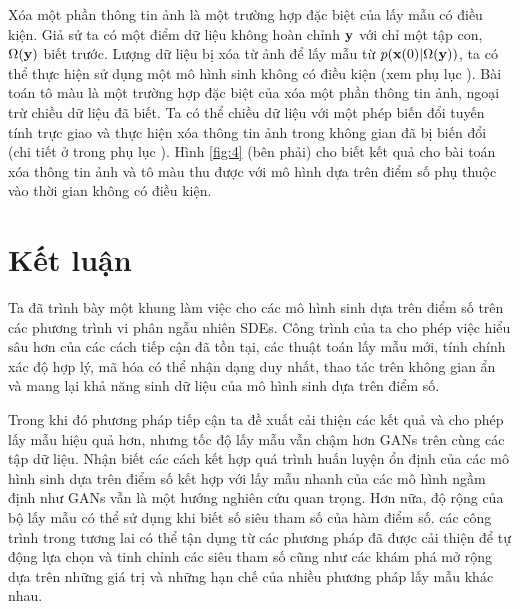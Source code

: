 \documentclass{article} %
\begin{document}
Xóa một phần thông tin ảnh là một trường hợp đặc biệt của lấy mẫu có điều kiện.
Giả sử ta có một điểm dữ liệu không hoàn chỉnh $\bold{y}$ với chỉ một tập con, $\Omega(\bold{y})$ biết trước.
Lượng dữ liệu bị xóa từ ảnh để lấy mẫu từ $p(\bold{x}(0) \vert \Omega(\bold{y}))$, ta có thể thực hiện sử dụng một mô hình sinh không có điều kiện (xem phụ lục ).
Bài toán tô màu là một trường hợp đặc biệt của xóa một phần thông tin ảnh, ngoại trừ chiều dữ liệu đã biết.
Ta có thể chiều dữ liệu với một phép biến đổi tuyến tính trực giao và thực hiện xóa thông tin ảnh trong không gian đã bị biến đổi (chi tiết ở trong phụ lục ).
Hình \ref{fig:4} (bên phải) cho biết kết quả cho bài toán xóa thông tin ảnh và tô màu thu được với mô hình dựa trên điểm số phụ thuộc vào thời gian không có điều kiện.

\section{Kết luận}

Ta đã trình bày một khung làm việc cho các mô hình sinh dựa trên điểm số trên các phương trình vi phân ngẫu nhiên SDEs.
Công trình của ta cho phép việc hiểu sâu hơn của các cách tiếp cận đã tồn tại, các thuật toán lấy mẫu mới, tính chính xác độ hợp lý, mã hóa có thể nhận dạng duy nhất, thao tác trên không gian ẩn và mang lại khả năng sinh dữ liệu của mô hình sinh dựa trên điểm số.

Trong khi đó phương pháp tiếp cận ta đề xuất cải thiện các kết quả và cho phép lấy mẫu hiệu quả hơn, nhưng tốc độ lấy mẫu vẫn chậm hơn GANs \citep{goodfellow2020generative} trên cùng các tập dữ liệu.
Nhận biết các cách kết hợp quá trình huấn luyện ổn định của các mô hình sinh dựa trên điểm số kết hợp với lấy mẫu nhanh của các mô hình ngầm định như GANs vẫn là một hướng nghiên cứu quan trọng.
Hơn nữa, độ rộng của bộ lấy mẫu có thể sử dụng khi biết số siêu tham số của hàm điểm số.
các công trình trong tương lai có thể tận dụng từ các phương pháp đã được cải thiện để tự động lựa chọn và tinh chỉnh các siêu tham số cũng như các khám phá mở rộng dựa trên những giá trị và những hạn chế của nhiều phương pháp lấy mẫu khác nhau.
\newpage



\newpage

\appendix
\end{document}
